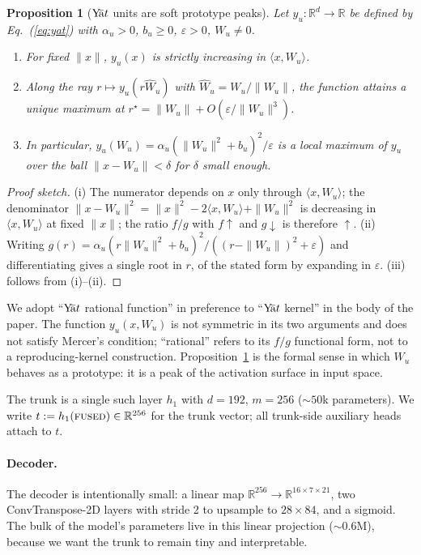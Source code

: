 \documentclass[11pt]{article}
\theoremstyle{papsty}
\newtheorem{proposition}{Proposition}
\newcommand{\yat}{$\textnormal{Y}\!\bar{\text{a}}t$}
\newcommand{\R}{\mathbb{R}}
\begin{document}
\begin{proposition}[\yat{} units are soft prototype peaks]
\label{prop:prototype}
Let $y_u : \R^d \to \R$ be defined by Eq.~(\ref{eq:yat}) with
$\alpha_u > 0$, $b_u \ge 0$, $\varepsilon > 0$, $W_u \ne 0$.
\begin{enumerate}[label=(\roman*),itemsep=2pt,topsep=2pt]
  \item For fixed $\|x\|$, $y_u(x)$ is strictly increasing in
        $\langle x, W_u\rangle$.
  \item Along the ray $r \mapsto y_u(r\hat W_u)$ with
        $\hat W_u = W_u/\|W_u\|$, the function attains a unique
        maximum at $r^\star = \|W_u\| + O(\varepsilon/\|W_u\|^3)$.
  \item In particular, $y_u(W_u) = \alpha_u (\|W_u\|^2 + b_u)^2 / \varepsilon$
        is a local maximum of $y_u$ over the ball $\|x - W_u\| < \delta$
        for $\delta$ small enough.
\end{enumerate}
\end{proposition}

\begin{proof}[Proof sketch]
(i) The numerator depends on $x$ only through $\langle x, W_u\rangle$;
the denominator $\|x - W_u\|^2 = \|x\|^2 - 2\langle x, W_u\rangle + \|W_u\|^2$
is decreasing in $\langle x, W_u\rangle$ at fixed $\|x\|$; the ratio
$f/g$ with $f \uparrow$ and $g \downarrow$ is therefore $\uparrow$.
(ii) Writing $g(r) = \alpha_u (r\|W_u\|^2 + b_u)^2 / ((r - \|W_u\|)^2 + \varepsilon)$
and differentiating gives a single root in $r$, of the stated form by
expanding in $\varepsilon$. (iii) follows from (i)--(ii).
\end{proof}

We adopt ``\yat{} rational function'' in preference to ``\yat{} kernel''
in the body of the paper. The function $y_u(x, W_u)$ is not symmetric in
its two arguments and does not satisfy Mercer's condition; ``rational''
refers to its $f/g$ functional form, not to a reproducing-kernel
construction. Proposition~\ref{prop:prototype} is the formal sense in
which $W_u$ behaves as a prototype: it is a peak of the activation
surface in input space.

The trunk is a single such layer $h_1$ with $d{=}192$, $m{=}256$
($\sim 50$k parameters). We write $t := h_1(\textsc{fused}) \in \R^{256}$
for the trunk vector; all trunk-side auxiliary heads attach to $t$.

\paragraph{Decoder.}
The decoder is intentionally small: a linear map
$\R^{256}\!\to\!\R^{16\times 7\times 21}$, two ConvTranspose-2D layers
with stride 2 to upsample to $28\!\times\!84$, and a sigmoid. The bulk of
the model's parameters live in this linear projection ($\sim 0.6$M),
because we want the trunk to remain tiny and interpretable.
\end{document}
